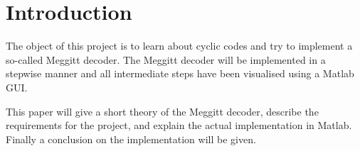\documentclass[MiniProjectMain]{subfiles}
\begin{document}
\chapter{Introduction}
The object of this project is to learn about cyclic codes and try to implement a so-called Meggitt decoder.
The Meggitt decoder will be implemented in a stepwise manner and all intermediate steps have been visualised using a Matlab GUI. 

This paper will give a short theory of the Meggitt decoder, describe the requirements for the project, and explain the actual implementation in Matlab.
Finally a conclusion on the implementation will be given.
\end{document}
